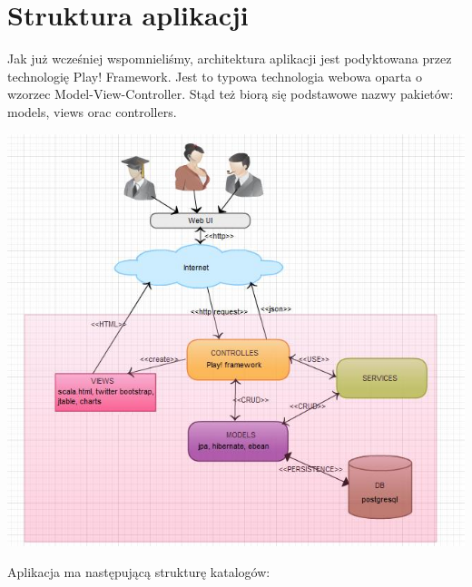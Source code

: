 \documentclass[a4paper,12pt,notitlepage]{mwrep}
\begin{document}
\section{Struktura aplikacji}
Jak już wcześniej wspomnieliśmy, architektura aplikacji jest podyktowana przez technologię Play! Framework. Jest to 
typowa technologia webowa oparta o wzorzec Model-View-Controller. Stąd też biorą się podstawowe nazwy pakietów: models, 
views orac controllers. \\
\begin{center}	
\vspace{4ex}	
	\includegraphics[scale=1.0]{images/tasksArch.jpg} \\
\vspace{4ex}
\end{center}

Aplikacja ma następującą strukturę katalogów:
\end{document}
